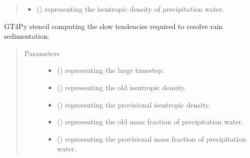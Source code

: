 \documentclass[letterpaper,10pt,english]{sphinxmanual}
\begin{document}
\begin{fulllineitems}
\begin{fulllineitems}
\begin{quote}
\begin{description}
\begin{itemize}
\item {} 
 () \textendash{}  representing the isentropic density of precipitation water.

\end{itemize}


\end{description}\end{quote}

\end{fulllineitems}


\begin{fulllineitems}
\label{\detokenize{api:tasmania.dycore.prognostic_isentropic_centered.PrognosticIsentropicCentered._stencil_computing_slow_tendencies_defs}}
GT4Py stencil computing the slow tendencies required to resolve rain sedimentation.
\begin{quote}\begin{description}
\item[{Parameters}] \leavevmode\begin{itemize}
\item {} 
 () \textendash{}  representing the large timestep.

\item {} 
 () \textendash{}  representing the old isentropic density.

\item {} 
 () \textendash{}  representing the provisional isentropic density.

\item {} 
 () \textendash{}  representing the old mass fraction of precipitation water.

\item {} 
 () \textendash{}  representing the provisional mass fraction of precipitation water.


\end{itemize}
\end{description}
\end{quote}
\end{fulllineitems}
\end{fulllineitems}
\end{document}
